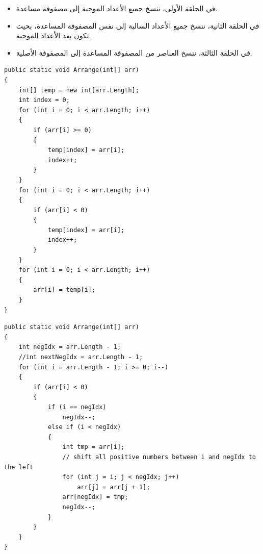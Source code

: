 \begin{boxSolution}
{\small
\begin{itemize}
    \item في الحلقة الأولى، ننسخ جميع الأعداد الموجبة إلى مصفوفة مساعدة.
    \item في الحلقة الثانية، ننسخ جميع الأعداد السالبة إلى نفس المصفوفة المساعدة، بحيث تكون بعد الأعداد الموجبة.
    \item في الحلقة الثالثة، ننسخ العناصر من المصفوفة المساعدة إلى المصفوفة الأصلية.
\end{itemize}
}
\begin{boxCode}
\begin{english}
\begin{verbatim}
public static void Arrange(int[] arr)
{
    int[] temp = new int[arr.Length];
    int index = 0;
    for (int i = 0; i < arr.Length; i++)
    {
        if (arr[i] >= 0)
        {
            temp[index] = arr[i];
            index++;
        }
    }
    for (int i = 0; i < arr.Length; i++)
    {
        if (arr[i] < 0)
        {
            temp[index] = arr[i];
            index++;
        }
    }
    for (int i = 0; i < arr.Length; i++)
    {
        arr[i] = temp[i];
    }
}
\end{verbatim}
\end{english}
\end{boxCode}
\end{boxSolution}

\clearpage

\begin{boxSolution}
\begin{boxCode}
\begin{english}
\begin{verbatim}
public static void Arrange(int[] arr)
{
    int negIdx = arr.Length - 1;
    //int nextNegIdx = arr.Length - 1;
    for (int i = arr.Length - 1; i >= 0; i--)
    {
        if (arr[i] < 0)
        {
            if (i == negIdx)
                negIdx--;
            else if (i < negIdx)
            {
                int tmp = arr[i];
                // shift all positive numbers between i and negIdx to the left
                for (int j = i; j < negIdx; j++)
                    arr[j] = arr[j + 1];
                arr[negIdx] = tmp;
                negIdx--;
            }
        }
    }
}
\end{verbatim}
\end{english}
\end{boxCode}

\end{boxSolution}
\clearpage
\fi
